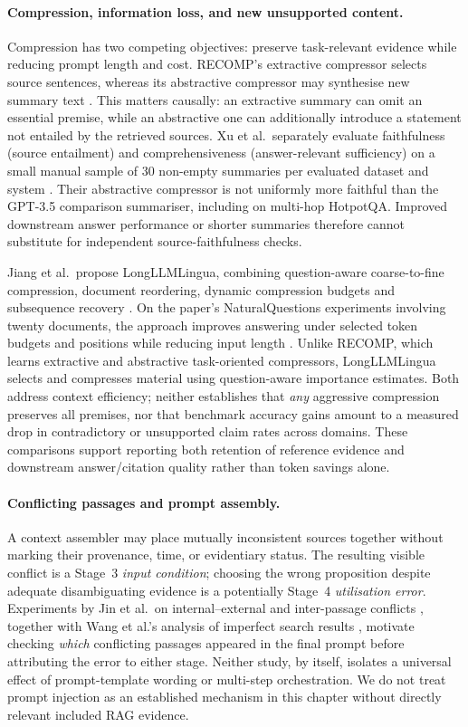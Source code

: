 \paragraph{Compression, information loss, and new unsupported content.}
Compression has two competing objectives: preserve task-relevant evidence while reducing prompt length and cost. RECOMP's extractive compressor selects source sentences, whereas its abstractive compressor may synthesise new summary text \cite[Secs.~2--3]{xu2024recomp}. This matters causally: an extractive summary can omit an essential premise, while an abstractive one can additionally introduce a statement not entailed by the retrieved sources. Xu et al.\ separately evaluate faithfulness (source entailment) and comprehensiveness (answer-relevant sufficiency) on a small manual sample of 30 non-empty summaries per evaluated dataset and system \cite[Sec.~6, Table~4]{xu2024recomp}. Their abstractive compressor is not uniformly more faithful than the GPT-3.5 comparison summariser, including on multi-hop HotpotQA. Improved downstream answer performance or shorter summaries therefore cannot substitute for independent source-faithfulness checks.

Jiang et al.\ propose LongLLMLingua, combining question-aware coarse-to-fine compression, document reordering, dynamic compression budgets and subsequence recovery \cite[Secs.~4--5]{jiang2024longllmlingua}. On the paper's NaturalQuestions experiments involving twenty documents, the approach improves answering under selected token budgets and positions while reducing input length \cite[Table~1]{jiang2024longllmlingua}. Unlike RECOMP, which learns extractive and abstractive task-oriented compressors, LongLLMLingua selects and compresses material using question-aware importance estimates. Both address context efficiency; neither establishes that \emph{any} aggressive compression preserves all premises, nor that benchmark accuracy gains amount to a measured drop in contradictory or unsupported claim rates across domains. These comparisons support reporting both retention of reference evidence and downstream answer/citation quality rather than token savings alone.

\paragraph{Conflicting passages and prompt assembly.}
A context assembler may place mutually inconsistent sources together without marking their provenance, time, or evidentiary status. The resulting visible conflict is a Stage~3 \emph{input condition}; choosing the wrong proposition despite adequate disambiguating evidence is a potentially Stage~4 \emph{utilisation error}. Experiments by Jin et al.\ on internal--external and inter-passage conflicts \cite[Secs.~3--4]{jin2024tug}, together with Wang et al.'s analysis of imperfect search results \cite[Sec.~3]{wang2025astute}, motivate checking \emph{which} conflicting passages appeared in the final prompt before attributing the error to either stage. Neither study, by itself, isolates a universal effect of prompt-template wording or multi-step orchestration. We do not treat prompt injection as an established mechanism in this chapter without directly relevant included RAG evidence.

